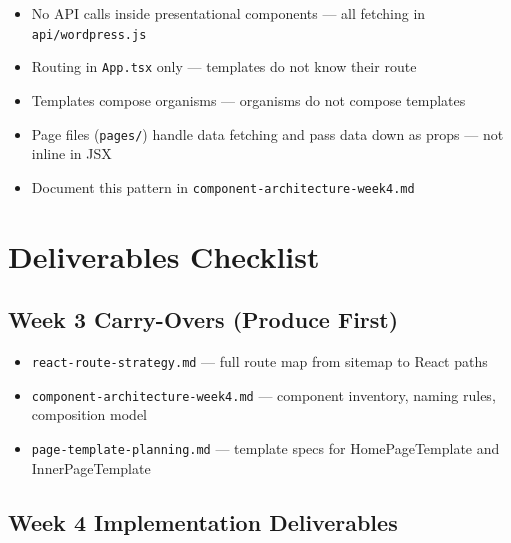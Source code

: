 \documentclass[12pt,a4paper]{article}
\begin{document}
\begin{itemize}
    \item[\faCheckCircle] No API calls inside presentational components --- all fetching in \texttt{api/wordpress.js}
    \item[\faCheckCircle] Routing in \texttt{App.tsx} only --- templates do not know their route
    \item[\faCheckCircle] Templates compose organisms --- organisms do not compose templates
    \item[$\square$] Page files (\texttt{pages/}) handle data fetching and pass data down as props --- not inline in JSX
    \item[$\square$] Document this pattern in \texttt{component-architecture-week4.md}
\end{itemize}

\section{Deliverables Checklist}

\subsection{Week 3 Carry-Overs (Produce First)}

\begin{itemize}
    \item[$\square$] \texttt{react-route-strategy.md} --- full route map from sitemap to React paths
    \item[$\square$] \texttt{component-architecture-week4.md} --- component inventory, naming rules, composition model
    \item[$\square$] \texttt{page-template-planning.md} --- template specs for HomePageTemplate and InnerPageTemplate
\end{itemize}

\subsection{Week 4 Implementation Deliverables}
\end{document}
